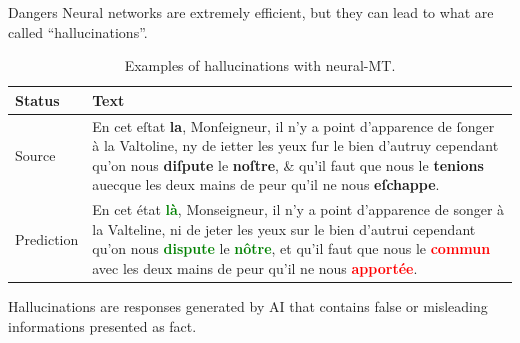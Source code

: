 \documentclass[aspectratio=169]{beamer}
\newcommand{\red}[1]{\textcolor{red}{\bf #1}}
\newcommand{\gre}[1]{\textcolor{green}{\bf #1}}
\begin{document}
    \begin{frame}{Dangers}
        \vspace{.5em}
        Neural networks are extremely efficient, but they can lead to what are called ``hallucinations''.

        \begin{table}[!h]
            \centering \scriptsize
            \begin{tabular}{p{1.2cm}|p{8cm}} 
            \toprule
            Status & Text \\
            \midrule
            Source   & En cet eſtat \textbf{la}, Monſeigneur, il n'y a point d'apparence de ſonger à la Valtoline, ny de ietter les yeux ſur le bien d'autruy cependant qu'on nous \textbf{diſpute} le \textbf{noſtre}, \& qu'il faut que nous le \textbf{tenions} auecque les deux mains de peur qu'il ne nous \textbf{eſchappe}.\\
            \midrule
            Prediction   & En cet état \gre{là}, Monseigneur, il n'y a point d'apparence de songer à la Valteline, ni de jeter les yeux sur le bien d'autrui cependant qu'on nous \gre{dispute} le \gre{nôtre}, et qu'il faut que nous le \red{commun} avec les deux mains de peur qu'il ne nous \red{apportée}.\\
            \bottomrule
            \end{tabular}
            \caption{Examples of hallucinations with neural-MT.}
        \end{table}
        
        Hallucinations are responses generated by AI that contains false or misleading informations presented as fact.
        
    \end{frame}

\end{document}
